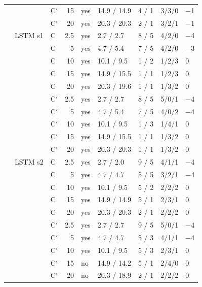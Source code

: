 \begin{scriptsize}
\begin{longtable}{lllrlllll}
 &  & C$'$ & 15 & yes & 14.9 / 14.9 & 4 / 1 & 3/3/0 & $-$1 \\
 &  & C$'$ & 20 & yes & 20.3 / 20.3 & 2 / 1 & 3/2/1 & $-$1 \\
 & LSTM s1 & C & 2.5 & yes & 2.7 / 2.7 & 8 / 5 & 4/2/0 & $-$4 \\
 &  & C & 5 & yes & 4.7 / 5.4 & 7 / 5 & 4/2/0 & $-$3 \\
 &  & C & 10 & yes & 10.1 / 9.5 & 1 / 2 & 1/2/3 & 0 \\
 &  & C & 15 & yes & 14.9 / 15.5 & 1 / 1 & 1/2/3 & 0 \\
 &  & C & 20 & yes & 20.3 / 19.6 & 1 / 1 & 1/3/2 & 0 \\
 &  & C$'$ & 2.5 & yes & 2.7 / 2.7 & 8 / 5 & 5/0/1 & $-$4 \\
 &  & C$'$ & 5 & yes & 4.7 / 5.4 & 7 / 5 & 4/0/2 & $-$4 \\
 &  & C$'$ & 10 & yes & 10.1 / 9.5 & 1 / 3 & 1/4/1 & 0 \\
 &  & C$'$ & 15 & yes & 14.9 / 15.5 & 1 / 1 & 1/3/2 & 0 \\
 &  & C$'$ & 20 & yes & 20.3 / 20.3 & 1 / 1 & 1/3/2 & 0 \\
 & LSTM s2 & C & 2.5 & yes & 2.7 / 2.0 & 9 / 5 & 4/1/1 & $-$4 \\
 &  & C & 5 & yes & 4.7 / 4.7 & 5 / 5 & 3/2/1 & $-$4 \\
 &  & C & 10 & yes & 10.1 / 9.5 & 5 / 2 & 2/2/2 & 0 \\
 &  & C & 15 & yes & 14.9 / 14.9 & 5 / 1 & 2/3/1 & 0 \\
 &  & C & 20 & yes & 20.3 / 20.3 & 2 / 1 & 2/2/2 & 0 \\
 &  & C$'$ & 2.5 & yes & 2.7 / 2.7 & 9 / 5 & 5/0/1 & $-$4 \\
 &  & C$'$ & 5 & yes & 4.7 / 4.7 & 5 / 3 & 4/1/1 & $-$4 \\
 &  & C$'$ & 10 & yes & 10.1 / 9.5 & 5 / 3 & 2/3/1 & 0 \\
 &  & C$'$ & 15 & no & 14.9 / 14.2 & 5 / 1 & 2/4/0 & 0 \\
 &  & C$'$ & 20 & no & 20.3 / 18.9 & 2 / 1 & 2/2/2 & 0 \\
\end{longtable}
\end{scriptsize}
